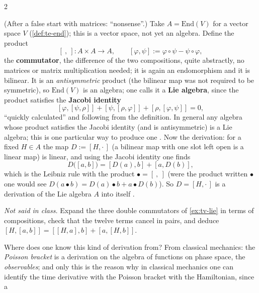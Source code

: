 \begin{paracol}{2}
\begin{example}\label{ex:tv-lie}
(After a false start with matrices: ``nonsense''.) Take $A=\mathrm{End}(V)$ for a vector space $V$ (\cref{def:te-end}); this is a vector space, not yet an algebra. Define the product
\[
  [\ ,\ ]\colon A\times A\to A,\qquad[\varphi,\psi]:=\varphi\circ\psi-\psi\circ\varphi,
\]
the \textbf{commutator}, the difference of the two compositions, quite abstractly, no matrices or matrix multiplication needed; it is again an endomorphism and it is bilinear. It is an \emph{antisymmetric} product (the bilinear map was not required to be symmetric), so $\mathrm{End}(V)$ is an algebra; one calls it a
\textbf{Lie algebra}, since the product satisfies the \textbf{Jacobi identity}
\[
  [\varphi,[\psi,\rho]]+[\psi,[\rho,\varphi]]+[\rho,[\varphi,\psi]]=0,
\]
``quickly calculated'' and following from the definition. In general any algebra whose product satisfies the Jacobi identity (and is antisymmetric) is a Lie algebra; this is one particular way to produce one      .
Now the derivation: for a fixed $H\in A$ the map $D:=[H,\cdot\,]$ (a bilinear map with one slot left open is a linear map) is linear, and using the Jacobi identity one finds
\[
  D\bigl([a,b]\bigr)=[D(a),b]+[a,D(b)],
\]
which is the Leibniz rule with the product $\bullet=[\ ,\ ]$ (were the product written $\bullet$ one would see $D(a\bullet b)=D(a)\bullet b+a\bullet D(b)$). So $D=[H,\cdot\,]$ is a derivation of the Lie algebra $A$ into itself      .
\end{example}
\begin{exercise}\label{ex:tv-jacobi}
\emph{Not said in class.} Expand the three double commutators of \cref{ex:tv-lie} in terms of compositions, check that the twelve terms cancel in pairs, and deduce $[H,[a,b]]=[[H,a],b]+[a,[H,b]]$.
\end{exercise}
\begin{remark}\label{rem:tv-physics}
Where does one know this kind of derivation from? From classical mechanics: the \emph{Poisson bracket} is a derivation on the algebra of functions on phase space, the \emph{observables}; and only this is the reason why in classical mechanics one can identify the time derivative with the Poisson bracket with the Hamiltonian, since a

\end{remark}
\end{paracol}

